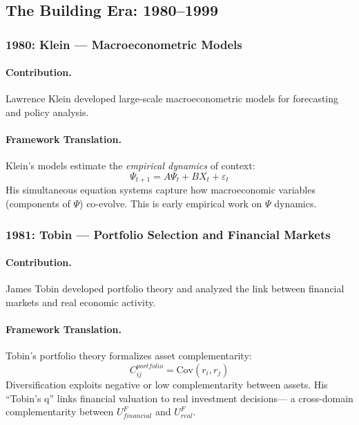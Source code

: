 \documentclass[12pt,a4paper]{article}
\begin{document}
\subsection{The Building Era: 1980--1999}

\subsubsection{1980: Klein --- Macroeconometric Models}

\paragraph{Contribution.}
Lawrence Klein developed large-scale macroeconometric models for forecasting
and policy analysis.

\paragraph{Framework Translation.}
Klein's models estimate the \emph{empirical dynamics} of context:
\begin{equation}
  \Psi_{t+1} = A \Psi_t + B X_t + \varepsilon_t
\end{equation}
His simultaneous equation systems capture how macroeconomic variables
(components of $\Psi$) co-evolve. This is early empirical work on $\Psi$ dynamics.

\subsubsection{1981: Tobin --- Portfolio Selection and Financial Markets}

\paragraph{Contribution.}
James Tobin developed portfolio theory and analyzed the link between
financial markets and real economic activity.

\paragraph{Framework Translation.}
Tobin's portfolio theory formalizes asset complementarity:
\begin{equation}
  C^{portfolio}_{ij} = \text{Cov}(r_i, r_j)
\end{equation}
Diversification exploits negative or low complementarity between assets.
His ``Tobin's q'' links financial valuation to real investment decisions---
a cross-domain complementarity between $U^F_{financial}$ and $U^F_{real}$.
\end{document}
